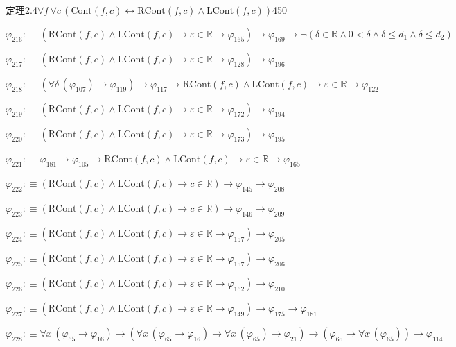 \begin{fullproof}{定理2.4}{$\forall f\,\forall c\,(\mathrm{Cont}(f,c) \leftrightarrow \mathrm{RCont}(f,c) \land \mathrm{LCont}(f,c))$}{450}
\begin{abbrevlist}
\item $\varphi_{216} :\equiv (\mathrm{RCont}(f,c) \land \mathrm{LCont}(f,c) \to \varepsilon \in \mathbb{R} \to \varphi_{165}) \to \varphi_{169} \to \neg (\delta \in \mathbb{R} \land 0 < \delta \land \delta \leq d_{1} \land \delta \leq d_{2})$
\item $\varphi_{217} :\equiv (\mathrm{RCont}(f,c) \land \mathrm{LCont}(f,c) \to \varepsilon \in \mathbb{R} \to \varphi_{128}) \to \varphi_{196}$
\item $\varphi_{218} :\equiv (\forall \delta\,(\varphi_{107}) \to \varphi_{119}) \to \varphi_{117} \to \mathrm{RCont}(f,c) \land \mathrm{LCont}(f,c) \to \varepsilon \in \mathbb{R} \to \varphi_{122}$
\item $\varphi_{219} :\equiv (\mathrm{RCont}(f,c) \land \mathrm{LCont}(f,c) \to \varepsilon \in \mathbb{R} \to \varphi_{172}) \to \varphi_{194}$
\item $\varphi_{220} :\equiv (\mathrm{RCont}(f,c) \land \mathrm{LCont}(f,c) \to \varepsilon \in \mathbb{R} \to \varphi_{173}) \to \varphi_{195}$
\item $\varphi_{221} :\equiv \varphi_{181} \to \varphi_{105} \to \mathrm{RCont}(f,c) \land \mathrm{LCont}(f,c) \to \varepsilon \in \mathbb{R} \to \varphi_{165}$
\item $\varphi_{222} :\equiv (\mathrm{RCont}(f,c) \land \mathrm{LCont}(f,c) \to c \in \mathbb{R}) \to \varphi_{145} \to \varphi_{208}$
\item $\varphi_{223} :\equiv (\mathrm{RCont}(f,c) \land \mathrm{LCont}(f,c) \to c \in \mathbb{R}) \to \varphi_{146} \to \varphi_{209}$
\item $\varphi_{224} :\equiv (\mathrm{RCont}(f,c) \land \mathrm{LCont}(f,c) \to \varepsilon \in \mathbb{R} \to \varphi_{157}) \to \varphi_{205}$
\item $\varphi_{225} :\equiv (\mathrm{RCont}(f,c) \land \mathrm{LCont}(f,c) \to \varepsilon \in \mathbb{R} \to \varphi_{157}) \to \varphi_{206}$
\item $\varphi_{226} :\equiv (\mathrm{RCont}(f,c) \land \mathrm{LCont}(f,c) \to \varepsilon \in \mathbb{R} \to \varphi_{162}) \to \varphi_{210}$
\item $\varphi_{227} :\equiv (\mathrm{RCont}(f,c) \land \mathrm{LCont}(f,c) \to \varepsilon \in \mathbb{R} \to \varphi_{149}) \to \varphi_{175} \to \varphi_{181}$
\item $\varphi_{228} :\equiv \forall x\,(\varphi_{65} \to \varphi_{16}) \to (\forall x\,(\varphi_{65} \to \varphi_{16}) \to \forall x\,(\varphi_{65}) \to \varphi_{21}) \to (\varphi_{65} \to \forall x\,(\varphi_{65})) \to \varphi_{114}$

\end{abbrevlist}
\end{fullproof}
